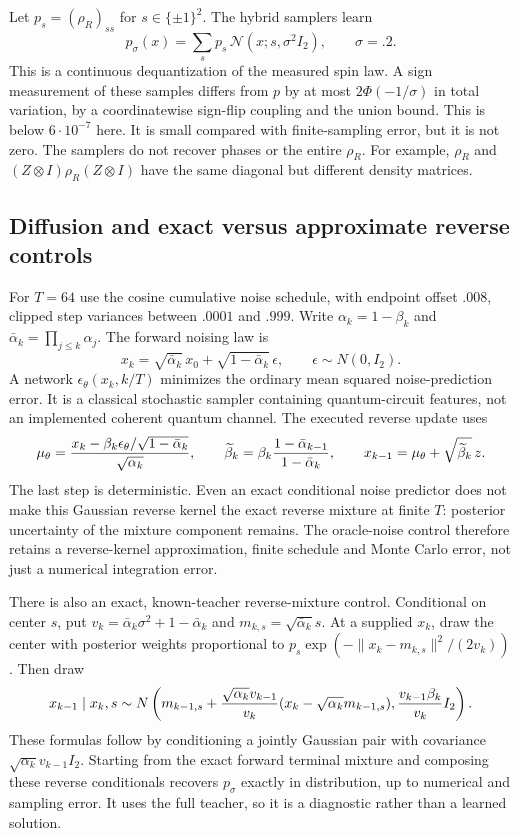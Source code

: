 \documentclass[11pt,oneside,openany]{book}
\theoremstyle{definition}\newtheorem{definition}[theorem]{Definition}
\theoremstyle{remark}\newtheorem{remark}[theorem]{Remark}
\begin{document}
Let $p_s=(\rho_R)_{ss}$ for $s\in\{\pm1\}^2$. The hybrid samplers learn
\[
 p_\sigma(x)=\sum_s p_s\,\mathcal N(x;s,\sigma^2I_2),\qquad\sigma=.2.
\]
This is a continuous dequantization of the measured spin law. A sign
measurement of these samples differs from $p$ by at most
$2\Phi(-1/\sigma)$ in total variation, by a coordinatewise sign-flip
coupling and the union bound. This is below $6\cdot10^{-7}$ here.
It is small compared with finite-sampling error, but it is not zero.
The samplers do not recover phases or the entire $\rho_R$. For example,
$\rho_R$ and $(Z\otimes I)\rho_R(Z\otimes I)$ have the same diagonal
but different density matrices.

\subsection{Diffusion and exact versus approximate reverse controls}
For $T=64$ use the cosine cumulative noise schedule, with endpoint offset
$.008$, clipped step variances between $.0001$ and $.999$.
Write $\alpha_k=1-\beta_k$ and $\bar\alpha_k=\prod_{j\leq k}\alpha_j$.
The forward noising law is
\[
 x_k=\sqrt{\bar\alpha_k}\,x_0+
       \sqrt{1-\bar\alpha_k}\,\epsilon,\qquad\epsilon\sim N(0,I_2).
\]
A network $\epsilon_\theta(x_k,k/T)$ minimizes the ordinary mean squared
noise-prediction error. It is a classical stochastic sampler containing
quantum-circuit features, not an implemented coherent quantum channel.
The executed reverse update uses
\[
 \mu_\theta={x_k-\beta_k\epsilon_\theta/
       \sqrt{1-\bar\alpha_k}\over\sqrt{\alpha_k}},\qquad
 \widetilde\beta_k=\beta_k{1-\bar\alpha_{k-1}\over1-\bar\alpha_k},
 \qquad x_{k-1}=\mu_\theta+\sqrt{\widetilde\beta_k}\,z.
\]
The last step is deterministic. Even an exact conditional noise predictor
does not make this Gaussian reverse kernel the exact reverse mixture at
finite $T$: posterior uncertainty of the mixture component remains.
The oracle-noise control therefore retains a reverse-kernel approximation,
finite schedule and Monte Carlo error, not just a numerical integration error.

There is also an exact, known-teacher reverse-mixture control. Conditional
on center $s$, put
$v_k=\bar\alpha_k\sigma^2+1-\bar\alpha_k$ and
$m_{k,s}=\sqrt{\bar\alpha_k}s$. At a supplied $x_k$, draw the center with
posterior weights proportional to
$p_s\exp(-\|x_k-m_{k,s}\|^2/(2v_k))$. Then draw
\[
 x_{k-1}\mid x_k,s\sim N\left(
 m_{k-1,s}+{\sqrt{\alpha_k}v_{k-1}\over v_k}
                   (x_k-\sqrt{\alpha_k}m_{k-1,s}),
 {v_{k-1}\beta_k\over v_k}I_2\right).
\]
These formulas follow by conditioning a jointly Gaussian pair with
covariance $\sqrt{\alpha_k}v_{k-1}I_2$. Starting from the exact forward
terminal mixture and composing these reverse conditionals recovers
$p_\sigma$ exactly in distribution, up to numerical and sampling error.
It uses the full teacher, so it is a diagnostic rather than a learned solution.
\end{document}
